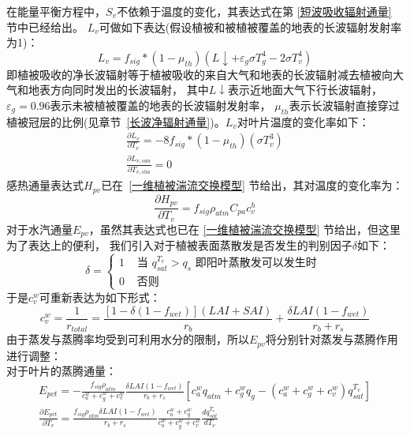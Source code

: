 在能量平衡方程中，$S_v$不依赖于温度的变化，其表达式在第 \ref{短波吸收辐射通量} 节中已经给出。
$L_v$可做如下表达(假设植被和被植被覆盖的地表的长波辐射发射率为1)：
\begin{equation}
L_{v}=f_{sig} *\left(1-\mu_{t h}\right)\left(L \downarrow+\varepsilon_{g} \sigma T_{g}^{4}-2 \sigma T_{v}^{4}\right)
\end{equation}
即植被吸收的净长波辐射等于植被吸收的来自大气和地表的长波辐射减去植被向大气和地表方向同时发出的长波辐射，
其中$L\downarrow$表示近地面大气下行长波辐射，$\varepsilon_g=0.96$表示未被植被覆盖的地表的长波辐射发射率，
$\mu_{th}$表示长波辐射直接穿过植被冠层的比例(见章节~\ref{长波净辐射通量})。$L_v$对叶片温度的变化率如下：
\begin{equation}
\begin{array}{c}\frac{\partial L_{v}}{\partial T_{v}}=-8 f_{sig} *\left(1-\mu_{t h}\right)\left(\sigma T_{v}^{3}\right) \\ \frac{\partial L_{v, s u n}}{\partial T_{v, s h a}}=0\end{array}
\end{equation}
感热通量表达式$H_{pv}$已在~\ref{一维植被湍流交换模型} 节给出，其对温度的变化率为：
\begin{equation}
\frac{\partial H_{p v}}{\partial T_{v}}=f_{sig} \rho_{atm} C_{pa} c_{v}^{h}
\end{equation}
对于水汽通量$E_{pv}$，虽然其表达式也已在 \ref{一维植被湍流交换模型} 节给出，但这里为了表达上的便利，
我们引入对于植被表面蒸散发是否发生的判别因子$\delta$如下：
\begin{equation}
\delta=\left\{\begin{array}{cc}1 & \text { 当 } q_{s a t}^{T_{v}}>q_{s} \text { 即阳叶蒸散发可以发生时 } \\ 0 & \text { 否则 }\end{array}\right.
\end{equation}
于是$c_v^w$可重新表达为如下形式：
\begin{equation}
c_{v}^{w}=\frac{1}{r_{total}}=\frac{\left[1-\delta\left(1-f_{wet}\right)\right](LAI+SAI)}{r_{b}}+\frac{\delta LAI\left(1-f_{wet}\right)}{r_{b}+r_{s}}
\end{equation}
由于蒸发与蒸腾率均受到可利用水分的限制，所以$E_{pv}$将分别针对蒸发与蒸腾作用进行调整：\\
对于叶片的蒸腾通量：
\begin{equation}
\begin{array}{c}E_{pvt}=-\frac{f_{sig} \rho_{atm}}{c_{a}^{w}+c_{g}^{w}+c_{v}^{w}} \frac{\delta LAI\left(1-f_{w e t}\right)}{r_{b}+r_{s}}\left[c_{a}^{w} q_{atm}+c_{g}^{w} q_{g}-\left(c_{a}^{w}+c_{g}^{w}+c_{v}^{w}\right) q_{s a t}^{T_{v}}\right] \\ \frac{\partial E_{pvt}}{\partial T_{v}}=\frac{f_{sig} \rho_{atm} \delta LAI\left(1-f_{w e t}\right)}{r_{b}+r_{s}} \frac{c_{a}^{w}+c_{g}^{w}}{c_{a}^{w}+c_{g}^{w}+c_{v}^{w}} \frac{d q_{s a t}^{T_{v}}}{d T_{v}}\end{array}
\end{equation}

